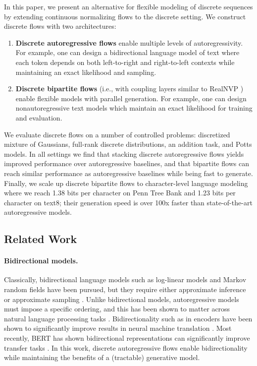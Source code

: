 \documentclass{article}
\begin{document}
In this paper, we present an alternative for flexible modeling of discrete sequences by extending continuous normalizing flows to the discrete setting. We construct discrete flows with two architectures:
\begin{enumerate}
\item
\textbf{Discrete autoregressive flows} enable multiple levels of autoregressivity. For example, one can design a bidirectional language model of text where each token depends on both left-to-right and right-to-left contexts while maintaining an exact likelihood and sampling.
\item
\textbf{Discrete bipartite flows} (i.e., with coupling layers similar to RealNVP \citep{dinh2017density}) enable flexible models with parallel generation. For example, one can design nonautoregressive text models which maintain an exact likelihood for training and evaluation.
\end{enumerate}

We evaluate discrete flows on a number of controlled problems: discretized mixture of Gaussians, full-rank discrete distributions, an addition task, and Potts models. In all settings we find that stacking discrete autoregressive flows yields improved performance over autoregressive baselines, and that bipartite flows can reach similar performance as autoregressive baselines while being fast to generate. Finally, we scale up discrete bipartite flows to character-level language modeling where we reach 1.38 bits per character on Penn Tree Bank and 1.23 bits per character on text8; their generation speed is over 100x faster than state-of-the-art autoregressive models.

\vspace{-1ex}
\subsection{Related Work}
\label{sub:related}


\paragraph{Bidirectional models.}
Classically, bidirectional language models such as log-linear models and Markov random fields have been pursued, but they require either approximate inference \citep{mnih2012fast,jernite2015fast} or approximate sampling \citep{berglund2015bidirectional}.
Unlike bidirectional models, autoregressive models must impose a specific ordering, and this has been shown to matter across natural language processing tasks \citep{vinyals2015order,ford2018importance,xia2017deliberation}. Bidirectionality such as in encoders have been shown to significantly improve results in neural machine translation \citep{britz2017massive}. Most recently, BERT has shown bidirectional representations can significantly improve transfer tasks \citep{devlin2018bert}.
In this work, discrete autoregressive flows enable bidirectionality while maintaining the benefits of a (tractable) generative model.
\end{document}
